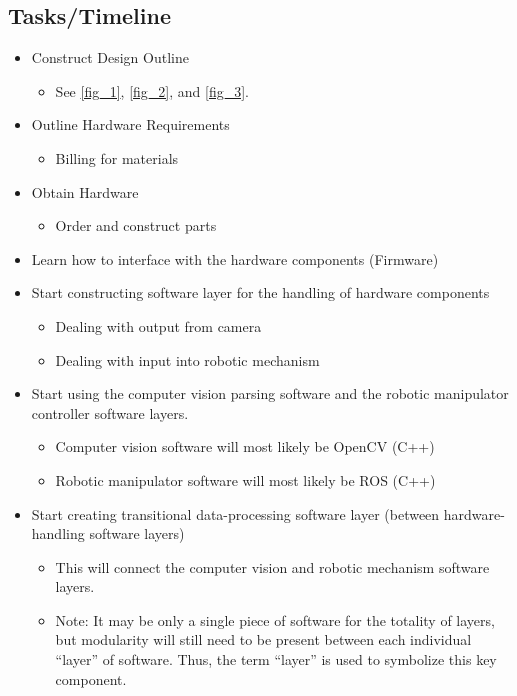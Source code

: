 \documentclass[letterpaper, 10 pt, conference]{ieeeconf}
\begin{document}
\subsection{Tasks/Timeline}
\begin{itemize}
\item Construct Design Outline
\begin{itemize}
\item See \ref{fig_1}, \ref{fig_2}, and \ref{fig_3}.
\end{itemize}
\item Outline Hardware Requirements
\begin{itemize}
\item Billing for materials
\end{itemize}
\item Obtain Hardware
\begin{itemize}
\item Order and construct parts
\end{itemize}
\item Learn how to interface with the hardware components (Firmware)
\item Start constructing software layer for the handling of hardware components
\begin{itemize}
\item Dealing with output from camera
\item Dealing with input into robotic mechanism
\end{itemize}
\item Start using the computer vision parsing software and the robotic manipulator controller software layers.
\begin{itemize}
\item Computer vision software will most likely be OpenCV \cite{opencv} (C++)
\item Robotic manipulator software will most likely be ROS \cite{ros} (C++)
\end{itemize}
\item Start creating transitional data-processing software layer (between hardware-handling software layers)
\begin{itemize}
\item This will connect the computer vision and robotic mechanism software layers.
\item Note: It may be only a single piece of software for the totality of layers, but modularity will still need to be present between each individual “layer” of software. Thus, the term “layer” is used to symbolize this key component.

\end{itemize}
\end{itemize}
\end{document}
